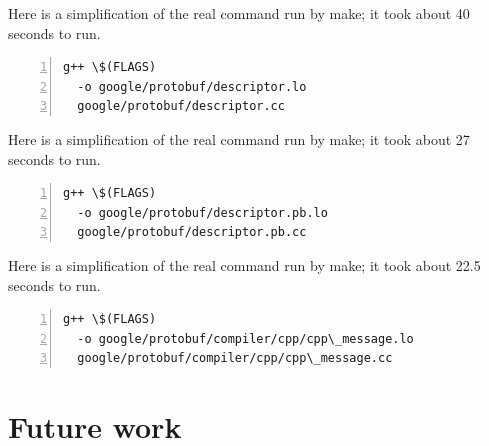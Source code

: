 \documentclass[sigplan,10pt,review,authorversion]{acmart}\settopmatter{printfolios=true,printccs=false,printacmref=false}
\begin{document}
Here is a simplification of the real command run by make; it took about 40 seconds to run.
\begin{Verbatim}[commandchars=\\\{\},codes={\catcode`$=3\catcode`^=7\catcode`_=8},fontsize=\small,numbers=left,xleftmargin=5mm]
  g++ \$(FLAGS)
  -o google/protobuf/descriptor.lo
  google/protobuf/descriptor.cc
\end{Verbatim}

Here is a simplification of the real command run by make; it took about 27 seconds to run.
\begin{Verbatim}[commandchars=\\\{\},codes={\catcode`$=3\catcode`^=7\catcode`_=8},fontsize=\small,numbers=left,xleftmargin=5mm]
  g++ \$(FLAGS)
  -o google/protobuf/descriptor.pb.lo
  google/protobuf/descriptor.pb.cc
\end{Verbatim}

Here is a simplification of the real command run by make; it took about 22.5 seconds to run.
\begin{Verbatim}[commandchars=\\\{\},codes={\catcode`$=3\catcode`^=7\catcode`_=8},fontsize=\small,numbers=left,xleftmargin=5mm]
  g++ \$(FLAGS)
  -o google/protobuf/compiler/cpp/cpp\_message.lo
  google/protobuf/compiler/cpp/cpp\_message.cc
\end{Verbatim}



\section{Future work}
\end{document}
